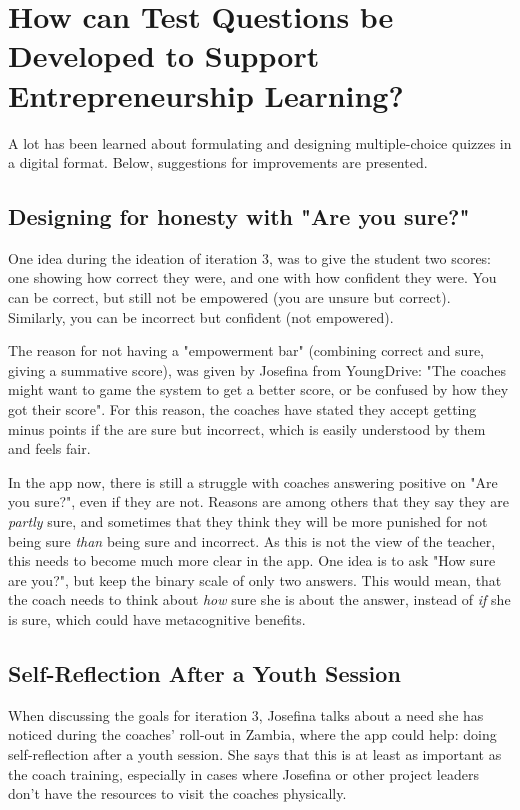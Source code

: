 \section{How can Test Questions be Developed to Support Entrepreneurship Learning?}

A lot has been learned about formulating and designing multiple-choice quizzes in a digital format. Below, suggestions for improvements are presented.

\subsection{Designing for honesty with "Are you sure?"}


One idea during the ideation of iteration 3, was to give the student two scores: one showing how correct they were, and one with how confident they were. You can be correct, but still not be empowered (you are unsure but correct). Similarly, you can be incorrect but confident (not empowered).

The reason for not having a "empowerment bar" (combining correct and sure, giving a summative score), was given by Josefina from YoungDrive: "The coaches might want to game the system to get a better score, or be confused by how they got their score". For this reason, the coaches have stated they accept getting minus points if the are sure but incorrect, which is easily understood by them and feels fair.

In the app now, there is still a struggle with coaches answering positive on "Are you sure?", even if they are not. Reasons are among others that they say they are \textit{partly} sure, and sometimes that they think they will be more punished for not being sure \textit{than} being sure and incorrect. As this is not the view of the teacher, this needs to become much more clear in the app. One idea is to ask "How sure are you?", but keep the binary scale of only two answers. This would mean, that the coach needs to think about \textit{how} sure she is about the answer, instead of \textit{if} she is sure, which could have metacognitive benefits.

\subsection{Self-Reflection After a Youth Session}
When discussing the goals for iteration 3, Josefina talks about a need she has noticed during the coaches' roll-out in Zambia, where the app could help: doing self-reflection after a youth session. She says that this is at least as important as the coach training, especially in cases where Josefina or other project leaders don't have the resources to visit the coaches physically.

